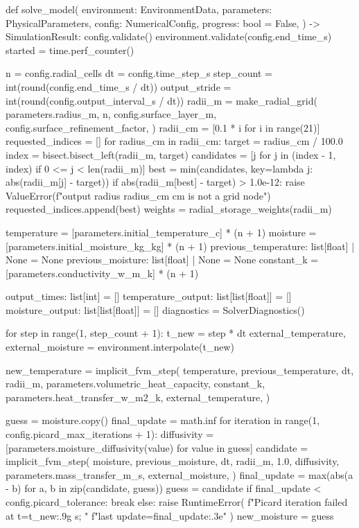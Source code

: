 \documentclass[withoutpreface,bwprint]{cumcmthesis}
\begin{document}
\begin{PythonCode}
def solve_model(
    environment: EnvironmentData,
    parameters: PhysicalParameters,
    config: NumericalConfig,
    progress: bool = False,
) -> SimulationResult:
    config.validate()
    environment.validate(config.end_time_s)
    started = time.perf_counter()

    n = config.radial_cells
    dt = config.time_step_s
    step_count = int(round(config.end_time_s / dt))
    output_stride = int(round(config.output_interval_s / dt))
    radii_m = make_radial_grid(
        parameters.radius_m,
        n,
        config.surface_layer_m,
        config.surface_refinement_factor,
    )
    radii_cm = [0.1 * i for i in range(21)]
    requested_indices = []
    for radius_cm in radii_cm:
        target = radius_cm / 100.0
        index = bisect.bisect_left(radii_m, target)
        candidates = [j for j in (index - 1, index) if 0 <= j < len(radii_m)]
        best = min(candidates, key=lambda j: abs(radii_m[j] - target))
        if abs(radii_m[best] - target) > 1.0e-12:
            raise ValueError(f"output radius {radius_cm} cm is not a grid node")
        requested_indices.append(best)
    weights = radial_storage_weights(radii_m)

    temperature = [parameters.initial_temperature_c] * (n + 1)
    moisture = [parameters.initial_moisture_kg_kg] * (n + 1)
    previous_temperature: list[float] | None = None
    previous_moisture: list[float] | None = None
    constant_k = [parameters.conductivity_w_m_k] * (n + 1)

    output_times: list[int] = []
    temperature_output: list[list[float]] = []
    moisture_output: list[list[float]] = []
    diagnostics = SolverDiagnostics()

    for step in range(1, step_count + 1):
        t_new = step * dt
        external_temperature, external_moisture = environment.interpolate(t_new)

        new_temperature = implicit_fvm_step(
            temperature,
            previous_temperature,
            dt,
            radii_m,
            parameters.volumetric_heat_capacity,
            constant_k,
            parameters.heat_transfer_w_m2_k,
            external_temperature,
        )

        guess = moisture.copy()
        final_update = math.inf
        for iteration in range(1, config.picard_max_iterations + 1):
            diffusivity = [parameters.moisture_diffusivity(value) for value in guess]
            candidate = implicit_fvm_step(
                moisture,
                previous_moisture,
                dt,
                radii_m,
                1.0,
                diffusivity,
                parameters.mass_transfer_m_s,
                external_moisture,
            )
            final_update = max(abs(a - b) for a, b in zip(candidate, guess))
            guess = candidate
            if final_update < config.picard_tolerance:
                break
        else:
            raise RuntimeError(
                f"Picard iteration failed at t={t_new:.9g} s; "
                f"last update={final_update:.3e}"
            )
        new_moisture = guess


\end{PythonCode}
\end{document}
